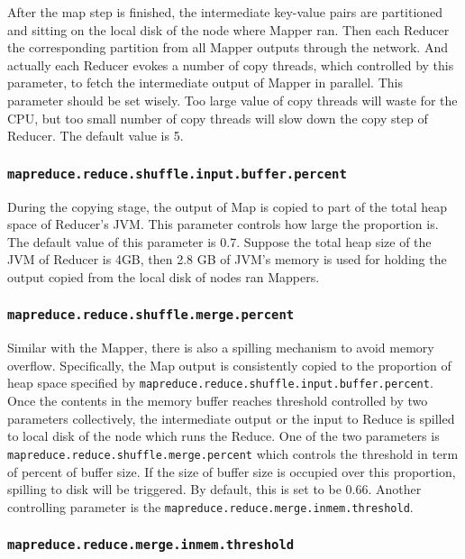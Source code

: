 After the map step is finished, the intermediate key-value pairs are partitioned
and sitting on the local disk of the node where Mapper ran. Then each Reducer 
the corresponding partition from all Mapper outputs through the network. And
actually each Reducer evokes a number of copy threads, which controlled by this
parameter, to fetch the intermediate output of Mapper in parallel. This parameter
should be set wisely. Too large value of copy threads will waste for the CPU,
but too small number of copy threads will slow down the copy step of Reducer.
The default value is 5.

\subsubsection{\texttt{mapreduce.reduce.shuffle.input.buffer.percent}}

During the copying stage, the output of Map is copied to part of the total heap 
space of Reducer's JVM. This parameter controls how large the proportion is.
The default value of this parameter is 0.7. Suppose the total heap size of the
JVM of Reducer is 4GB, then 2.8 GB of JVM's memory is used for holding the output
copied from the local disk of nodes ran Mappers.

\subsubsection{\texttt{mapreduce.reduce.shuffle.merge.percent}}

Similar with the Mapper, there is also a spilling mechanism to avoid memory 
overflow. Specifically, the Map output is consistently copied to the proportion 
of heap space specified by \texttt{mapreduce.reduce.shuffle.input.buffer.percent}.
Once the contents in the memory buffer reaches threshold controlled by two 
parameters collectively, the intermediate output or the input to Reduce is spilled 
to local disk of the node which runs the Reduce. One of the two parameters is \\
\texttt{mapreduce.reduce.shuffle.merge.percent} which controls the threshold in 
term of percent of buffer size. If the size of buffer size is occupied over this
proportion, spilling to disk will be triggered. By default, this is set to be 
0.66. Another controlling parameter is the 
\texttt{mapreduce.reduce.merge.inmem.threshold}.

\subsubsection{\texttt{mapreduce.reduce.merge.inmem.threshold}}

